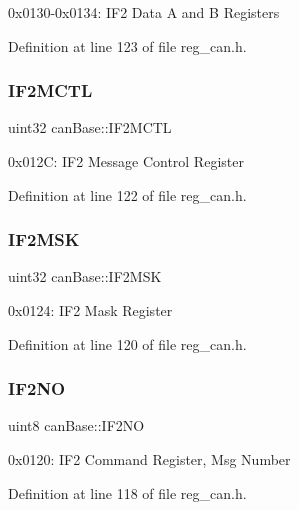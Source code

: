 0x0130-\/0x0134\+: I\+F2 Data A and B Registers 

Definition at line 123 of file reg\+\_\+can.\+h.

\mbox{\label{structcanBase_a1181a25757f060f1ec12ede4442970df}} 
\subsubsection{\texorpdfstring{I\+F2\+M\+C\+TL}{IF2MCTL}}
{\footnotesize\ttfamily uint32 can\+Base\+::\+I\+F2\+M\+C\+TL}

0x012C\+: I\+F2 Message Control Register 

Definition at line 122 of file reg\+\_\+can.\+h.

\mbox{\label{structcanBase_a579c3b235063b5cb38f59fbfff742a5c}} 
\subsubsection{\texorpdfstring{I\+F2\+M\+SK}{IF2MSK}}
{\footnotesize\ttfamily uint32 can\+Base\+::\+I\+F2\+M\+SK}

0x0124\+: I\+F2 Mask Register 

Definition at line 120 of file reg\+\_\+can.\+h.

\mbox{\label{structcanBase_a90eb4f88e7bab70d32b91d8dc4e28fbb}} 
\subsubsection{\texorpdfstring{I\+F2\+NO}{IF2NO}}
{\footnotesize\ttfamily uint8 can\+Base\+::\+I\+F2\+NO}

0x0120\+: I\+F2 Command Register, Msg Number 

Definition at line 118 of file reg\+\_\+can.\+h.

\mbox{\label{structcanBase_a2abe92aa8b21f7e188949856b0558b64}} 
